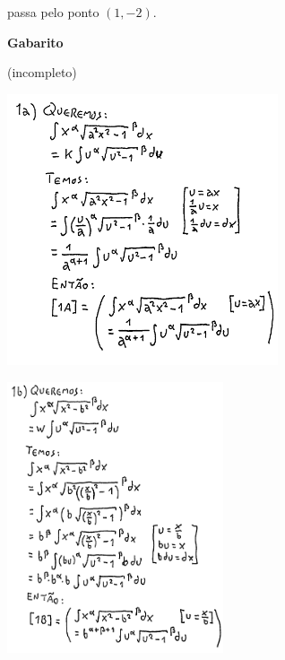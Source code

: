 \documentclass[oneside,12pt]{article}
\begin{document}
passa pelo ponto $(1,-2)$.




\newpage

\thispagestyle{empty}

\begin{center}

\vspace*{2.0cm}

{\bf \Large Gabarito}

(incompleto)

\end{center}


\newpage


\includegraphics[height=8cm]{2020-2-C2/20210502_C2_P2_1a.pdf}

\includegraphics[height=8cm]{2020-2-C2/20210502_C2_P2_1b.pdf}
\end{document}
